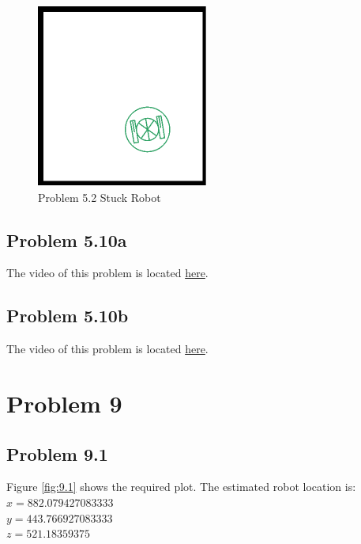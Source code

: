 \documentclass{article}
\begin{document}
\begin{figure}[h]
    \centering
    \includegraphics[pages=1]{stuck1}
    \caption{Problem 5.2 Stuck Robot}
    \label{fig:stuck1}
\end{figure}

\subsection{Problem 5.10a}
The video of this problem is located 
\href{https://drive.google.com/file/d/158lYEesD_xV_S8fiunUpkM-AS9iSTOBF/view?usp=sharing}{here}.

\subsection{Problem 5.10b}
The video of this problem is located 
\href{https://drive.google.com/file/d/1KejtCB_fl7QwS-vBHIORikhwSmSrqyOh/view?usp=sharing}{here}.


\newpage
\section{\textbf{Problem 9}}
\subsection{Problem 9.1}
Figure \ref{fig:9.1} shows the required plot. The estimated robot location is:\\
$x = 882.079427083333$\\
$y = 443.766927083333$\\
$z = 521.18359375$\\
\end{document}
